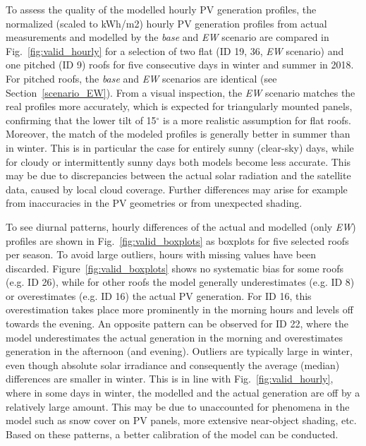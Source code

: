 To assess the quality of the modelled hourly PV generation profiles, the normalized (scaled to kWh/m2) hourly PV generation profiles from actual measurements and modelled by the \textit{base} and \textit{EW} scenario are compared in Fig.~\ref{fig:valid_hourly} for a selection of two flat (ID 19, 36, \textit{EW} scenario) and one pitched (ID 9) roofs for five consecutive days in winter and summer in 2018. For pitched roofs, the \textit{base} and \textit{EW} scenarios are identical (see Section~\ref{scenario_EW}). From a visual inspection, the \textit{EW} scenario matches the real profiles more accurately, which is expected for triangularly mounted panels, confirming that the lower tilt of 15$^\circ$ is a more realistic assumption for flat roofs. Moreover, the match of the modeled profiles is generally better in summer than in winter. This is in particular the case for entirely sunny (clear-sky) days, while for cloudy or intermittently sunny days both models become less accurate. This may be due to discrepancies between the actual solar radiation and the satellite data, caused by local cloud coverage. Further differences may arise for example from inaccuracies in the PV geometries or from unexpected shading.

To see diurnal patterns, hourly differences of the actual and modelled (only \textit{EW}) profiles are shown in Fig.~\ref{fig:valid_boxplots} as boxplots for five selected roofs per season. To avoid large outliers, hours with missing values have been discarded. Figure~\ref{fig:valid_boxplots} shows no systematic bias for some roofs (e.g. ID 26), while for other roofs the model generally underestimates (e.g. ID 8) or overestimates (e.g. ID 16) the actual PV generation. For ID 16, this overestimation takes place more prominently in the morning hours and levels off towards the evening. An opposite pattern can be observed for ID 22, where the model underestimates the actual generation in the morning and overestimates generation in the afternoon (and evening). Outliers are typically large in winter, even though absolute solar irradiance and consequently the average (median) differences are smaller in winter. This is in line with Fig.~\ref{fig:valid_hourly}, where in some days in winter, the modelled and the actual generation are off by a relatively large amount. This may be due to unaccounted for phenomena in the model such as snow cover on PV panels, more extensive near-object shading, etc. Based on these patterns, a better calibration of the model can be conducted. 


